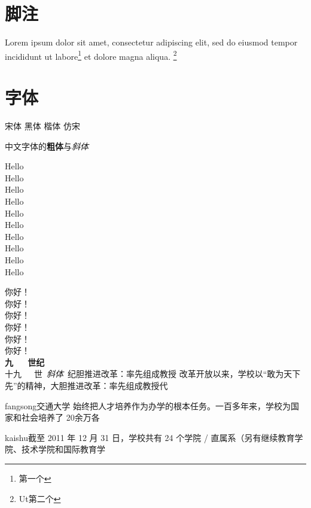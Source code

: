 \section{脚注}

Lorem ipsum dolor sit amet, consectetur adipiscing elit, sed do eiusmod tempor
incididunt ut labore\footnote{第一个} et dolore magna aliqua. \footnote{%
Ut第二个}

\section{字体}
{\songti 宋体} {\heiti 黑体} {\kaishu 楷体} {\fangsong 仿宋}

中文字体的\textbf{粗体}与\textit{斜体}

{\tiny          Hello}\\
{\scriptsize    Hello}\\
{\footnotesize  Hello}\\
{\small         Hello}\\
{\normalsize    Hello}\\
{\large         Hello}\\
{\Large         Hello}\\
{\LARGE         Hello}\\
{\huge          Hello}\\
{\Huge          Hello}

 你好！\\
 你好！\\
 你好！\\
 你好！\\
 你好！\\
 你好！\\

{\songti {} \textbf{九~~~世纪}\\十九~~~世~\textit{斜体}~纪胆推进改革：率先组成教授
}
{\songti%
 改革开放以来，学校以“敢为天下先”的精神，大胆推进改革：率先组成教授代
}

{\ifcsname fangsong\endcsname\fangsong\else[无 \cs{fangsong} 字体。]\fi 交通大学
  始终把人才培养作为办学的根本任务。一百多年来，学校为国家和社会培养了 20余万各
}

{\ifcsname kaishu\endcsname\kaishu\else[无 \cs{kaishu} 字体。]\fi 截至 2011 年 12
  月 31 日，学校共有 24 个学院 / 直属系（另有继续教育学院、技术学院和国际教育学
 }